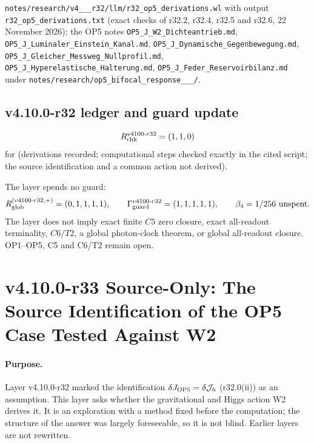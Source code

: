 \texttt{notes/\allowbreak research/\allowbreak v4\_\_\_\allowbreak r32/\allowbreak llm/\allowbreak r32\_\allowbreak op5\_\allowbreak derivations.wl} with output
\texttt{r32\_\allowbreak op5\_\allowbreak derivations.txt} (exact checks of r32.2, r32.4, r32.5 and r32.6, 22 November 2026); the OP5 notes
\texttt{OP5\_\allowbreak J\_\allowbreak W2\_\allowbreak Dichteantrieb.md}, \texttt{OP5\_\allowbreak J\_\allowbreak Luminaler\_\allowbreak Einstein\_\allowbreak Kanal.md},
\texttt{OP5\_\allowbreak J\_\allowbreak Dynamische\_\allowbreak Gegenbewegung.md}, \texttt{OP5\_\allowbreak J\_\allowbreak Gleicher\_\allowbreak Messweg\_\allowbreak Nullprofil.md},
\texttt{OP5\_\allowbreak J\_\allowbreak Hyperelastische\_\allowbreak Halterung.md}, \texttt{OP5\_\allowbreak J\_\allowbreak Feder\_\allowbreak Reservoirbilanz.md} under
\texttt{notes/\allowbreak research/\allowbreak op5\_\allowbreak bifocal\_\allowbreak response\_\_\_/}.

\subsection*{v4.10.0-r32 ledger and guard update}
\label{subsec:v4100-r32-ledger-guard}

\[
R_{\rm chk}^{v4100\text{-}r32}=(1,1,0)
\]
for (derivations recorded; computational steps checked exactly in the cited script; the source identification and a common action not
derived).

The layer spends no guard:
\[
R_{\rm glob}^{(v4100\text{-}r32,+)}=(0,1,1,1,1),
\qquad
\Gamma_{\rm guard}^{v4100\text{-}r32}=(1,1,1,1,1),
\qquad
\beta_4=1/256\ \text{unspent}.
\]
The layer does not imply exact finite \(C5\) zero closure, exact all-readout terminality, \(C6/T2\), a global photon-clock theorem,
or global all-readout closure.  OP1--OP5, C5 and C6/T2 remain open.

\clearpage
\section*{v4.10.0-r33 Source-Only: The Source Identification of the OP5 Case Tested Against W2}
\label{sec:v4100-r33-assumption40}

\paragraph{Purpose.}
Layer v4.10.0-r32 marked the identification \(\delta J_{\rm OP5}=\delta\mathcal J_h\) (r32.0(ii)) as an assumption.  This layer asks whether the
gravitational and Higgs action W2 derives it.  It is an exploration with a method fixed before the computation; the structure of the
answer was largely foreseeable, so it is not blind.  Earlier layers are not rewritten.

